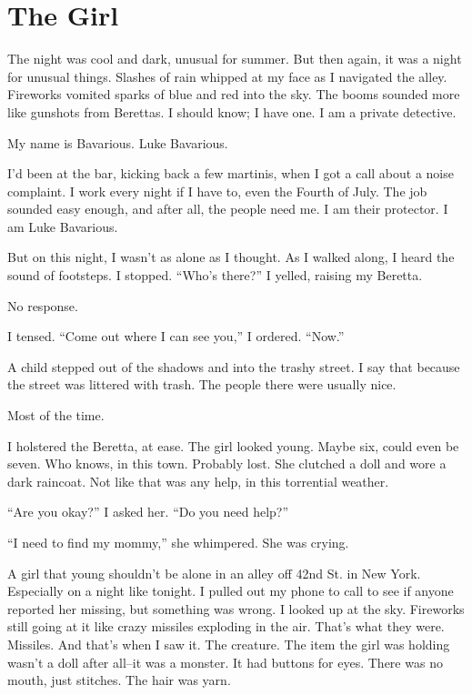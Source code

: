 \chapter{The Girl}



The night was cool and dark, unusual for summer. But then again, it
was a night for unusual things. Slashes of rain whipped at my face
as I navigated the alley. Fireworks vomited sparks of blue and red
into the sky. The booms sounded more like gunshots from Berettas. I
should know; I have one. I am a private detective.



My name is Bavarious. Luke Bavarious.



I'd been at the bar, kicking back a few martinis, when I got a call
about a noise complaint. I work every night if I have to, even the
Fourth of July. The job sounded easy enough, and after all, the
people need me. I am their protector. I am Luke Bavarious.



But on this night, I wasn't as alone as I thought. As I walked
along, I heard the sound of footsteps. I stopped. ``Who's there?'' I
yelled, raising my Beretta.



No response.



I tensed. ``Come out where I can see you,'' I ordered. ``Now.''



A child stepped out of the shadows and into the trashy street. I
say that because the street was littered with trash. The people
there were usually nice.



Most of the time.



I holstered the Beretta, at ease. The girl looked young. Maybe six,
could even be seven. Who knows, in this town. Probably lost. She
clutched a doll and wore a dark raincoat. Not like that was any
help, in this torrential weather.



``Are you okay?'' I asked her. ``Do you need help?''



``I need to find my mommy,'' she whimpered. She was crying.



A girl that young shouldn't be alone in an alley off 42nd St. in
New York. Especially on a night like tonight. I pulled out my phone
to call to see if anyone reported her missing, but something was
wrong. I looked up at the sky. Fireworks still going at it like
crazy missiles exploding in the air. That's what they were.
Missiles. And that's when I saw it. The creature. The item the girl
was holding wasn't a doll after all--it was a monster. It had
buttons for eyes. There was no mouth, just stitches. The hair was
yarn.



